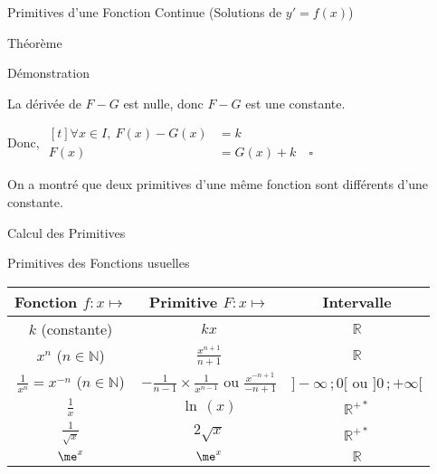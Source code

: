 \documentclass{cours}
\begin{document}
\begin{Gpartie}{Primitives d'une Fonction Continue \big(Solutions de $y'=f(x)$\big)}
\begin{Spartie}{Théorème}
\begin{SSpartie}{Démonstration}
\begin{enumerate}
                    La dérivée de $F-G$ est nulle, donc $F-G$ est une constante.
    
                    Donc, 
                    $\begin{aligned}[t]
                        \forall x\in I,\ F(x)-G(x)&=k \\
                        F(x)&=G(x)+k\quad\square
                    \end{aligned}$
    
                    On a montré que deux primitives d'une même fonction sont différents d'une constante.
                \end{enumerate}
            \end{SSpartie}
        \end{Spartie}
    \end{Gpartie}
    \begin{Gpartie}{Calcul des Primitives} 
        \vspace{-5ex}
        \begin{Spartie}{Primitives des Fonctions usuelles} 
            \begin{table}[H] \centering {}
                \begin{tabular}[c]{ @{}*{3}{C}@{} } \toprule
                    Fonction $f:x\mapsto$                       & Primitive $F:x\mapsto$                                            & Intervalle  \\ \midrule
                    $k$ (constante)                             & $kx$                                                              & $\mathbb{R}$ \\ 
                    $x^n$ ($n\in\mathbb{N}$)                    & $\frac{x^{n+1}}{n+1}$                                             & $\mathbb{R}$ \\ 
                    $\frac{1}{x^n}=x^{-n}$ ($n\in\mathbb{N}$)   & $-\frac{1}{n-1}\times\frac{1}{x^{n-1}}$ ou $\frac{x^{-n+1}}{-n+1}$& $\big]-\infty\,; 0\big[$ ou $\big]0\,; +\infty\big[$ \\ 
                    $\frac{1}{x}$                               & $\ln\,(x)$                                                          & $\mathbb{R^{+*}}$ \\ 
                    $\frac{1}{\sqrt{x}}$                        & $2\sqrt{x}$                                                       & $\mathbb{R^{+*}}$ \\ 
                    $\me^x$                                       & $\me^x$                                                             & $\mathbb{R}$ \\ 

\end{tabular}
\end{table}
\end{Spartie}
\end{Gpartie}
\end{document}
